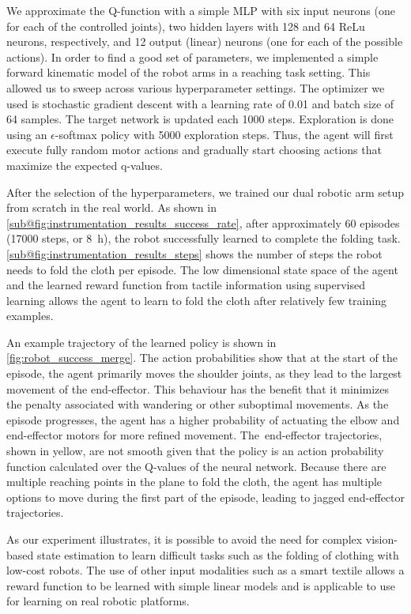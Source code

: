 \documentclass[\home/main.tex]{subfiles}
\begin{document}
We approximate the Q-function with a simple MLP with six input neurons (one for each of the controlled joints), two hidden layers with 128 and 64 ReLu neurons, respectively, and \qty{12}{} output (linear) neurons (one for each of the possible actions). In order to find a good set of parameters, we implemented a simple forward kinematic model of the robot arms in a reaching task setting. This allowed us to sweep across various hyperparameter settings. The optimizer we used is stochastic gradient descent with a learning rate of \qty{0.01}{} and batch size of \qty{64}{} samples. The target network is updated each \qty{1000}{} steps. Exploration is done using an $\epsilon$-softmax policy with \qty{5000}{} exploration steps. Thus, the agent will first execute fully random motor actions and gradually start choosing actions that maximize the expected q-values.

After the selection of the hyperparameters, we trained our dual robotic arm setup from scratch in the real world. As shown in \cref{sub@fig:instrumentation_results_success_rate}, after approximately 60 episodes (\qty{17000}{} steps, or \qty{8}{\hour}), the robot successfully learned to complete the folding task. \cref{sub@fig:instrumentation_results_steps} shows the number of steps the robot needs to fold the cloth per episode. The low dimensional state space of the agent and the learned reward function from tactile information using supervised learning allows the agent to learn to fold the cloth after relatively few training examples.

An example trajectory of the learned policy is shown in \cref{fig:robot_success_merge}. The action probabilities show that at the start of the episode, the agent primarily moves the shoulder joints, as they lead to the largest movement of the end-effector. This behaviour has the benefit that it minimizes the penalty associated with wandering or other suboptimal movements. As the episode progresses, the agent has a higher probability of actuating the elbow and end-effector motors for more refined movement. The~end-effector trajectories, shown in yellow, are not smooth given that the policy is an action probability function calculated over the Q-values of the neural network. Because there are multiple reaching points in the plane to fold the cloth, the agent has multiple options to move during the first part of the episode, leading to jagged end-effector trajectories.

As our experiment illustrates, it is possible to avoid the need for complex vision-based state estimation to learn difficult tasks such as the folding of clothing with low-cost robots. The use of other input modalities such as a smart textile allows a reward function to be learned with simple linear models and is applicable to use for learning on real robotic platforms.
\end{document}
